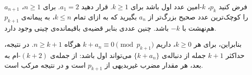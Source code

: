 فرض کنید $p_{k}$، $k$-امین عدد اول باشد برای $k \geq 1$. قرار دهید $a_{1} = 2$. برای $n \geq 1$، $a_{n+1}$ را کوچک‌ترین عدد صحیح بزرگ‌تر از $a_{n}$ بگیرید که به ازای تمام $k \leq n$، به پیمانه‌ی $p_{k+1}$ هم‌نهشت با $-k$ باشد. چنین عددی بنابر قضیه‌ی باقیمانده‌ی چینی وجود دارد.

بنابراین، برای هر $k \geq 0$، داریم $k + a_{n} \equiv 0 \pmod{p_{k+1}}$ هرگاه $n \geq k+1$. در نتیجه، حداکثر $k+1$ جمله از دنباله‌ی $\{k + a_{n}\}$ می‌تواند اول باشد: از جمله‌ی $(k+2)$-ام به بعد، هر مقدار مضرب غیربدیهی از $p_{k+1}$ است و در نتیجه مرکب است.
